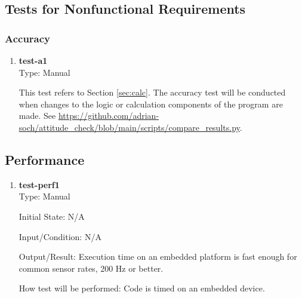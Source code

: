 \documentclass[12pt, titlepage]{article}
\newcommand{\Tthetestnum}{T\thetestnum}
\begin{document}
\subsection{Tests for Nonfunctional Requirements}




\subsubsection{Accuracy}


\begin{enumerate}

\item[\refstepcounter{testnum} \Tthetestnum \label{t:a1}:] \textbf{test-a1} \\

    Type: Manual

    This test refers to Section \ref{sec:calc}. The accuracy test will be conducted when changes to
    the logic or calculation components of the program are made. See
    \url{https://github.com/adrian-soch/attitude_check/blob/main/scripts/compare_results.py}.
\end{enumerate}

\subsection{Performance}

\begin{enumerate}

  \item[\refstepcounter{testnum} \Tthetestnum \label{t:perf1}:] \textbf{test-perf1} \\

      Type: Manual

      Initial State: N/A

      Input/Condition: N/A

      Output/Result: Execution time on an embedded platform is fast enough for common sensor rates,
      200 Hz or better.

      How test will be performed: Code is timed on an embedded device.
  \end{enumerate}
\end{document}
